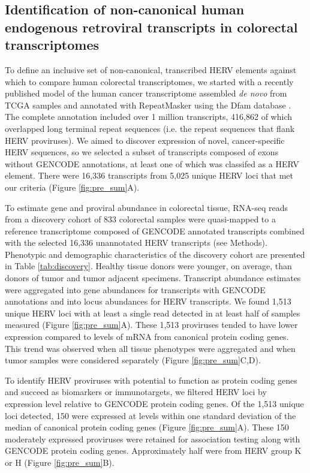 \subsection*{Identification of non-canonical human endogenous retroviral transcripts in colorectal transcriptomes}
To define an inclusive set of non-canonical, transcribed HERV elements against which to compare human colorectal transcriptomes, we started with a recently published model of the human cancer transcriptome assembled \emph{de novo} from TCGA samples and annotated with RepeatMasker using the Dfam database \citep{Attig2019}.
The complete annotation included over 1 million transcripts, 416,862 of which overlapped long terminal repeat sequences (i.e. the repeat sequences that flank HERV proviruses).
We aimed to discover expression of novel, cancer-specific HERV sequences, so we selected a subset of transcripts composed of exons without GENCODE annotations, at least one of which was classifed as a HERV element.
There were 16,336 transcripts from 5,025 unique HERV loci that met our criteria (Figure \ref{fig:pre_sum}A).

To estimate gene and proviral abundance in colorectal tissue, RNA-seq reads from a discovery cohort of 833 colorectal samples were quasi-mapped to a reference transcriptome composed of GENCODE annotated transcripts combined with the selected 16,336 unannotated HERV transcripts (see Methods).
Phenotypic and demographic characteristics of the discovery cohort are presented in Table \ref{tab:discovery}.
Healthy tissue donors were younger, on average, than donors of tumor and tumor adjacent specimens.
Transcript abundance estimates were aggregated into gene abundances for transcripts with GENCODE annotations and into locus abundances for HERV transcripts.
We found 1,513 unique HERV loci with at least a single read detected in at least half of samples measured (Figure \ref{fig:pre_sum}A).
These 1,513 proviruses tended to have lower expression compared to levels of mRNA from canonical protein coding genes.
This trend was observed when all tissue phenotypes were aggregated and when tumor samples were considered separately (Figure \ref{fig:pre_sum}C,D).

To identify HERV proviruses with potential to function as protein coding genes and succeed as biomarkers or immunotargets, we filtered HERV loci by expression level relative to GENCODE protein coding genes.
Of the 1,513 unique loci detected, 150 were expressed at levels within one standard deviation of the median of canonical protein coding genes (Figure \ref{fig:pre_sum}A).
These 150 moderately expressed proviruses were retained for association testing along with GENCODE protein coding genes.
Approximately half were from HERV group K or H (Figure \ref{fig:pre_sum}B).

